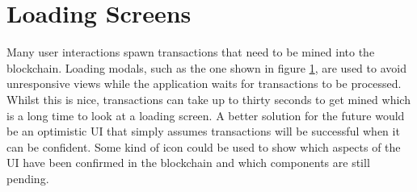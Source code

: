\section{Loading Screens}
\begin{figure}
\centering
{}
\decoRule
\caption[]{}
\label{fig:waitpage}
\end{figure}

Many user interactions spawn transactions that need to be mined into the blockchain. Loading modals, such as the one shown in figure \ref{fig:waitpage}, are used to avoid unresponsive views while the application waits for transactions to be processed. Whilst this is nice, transactions can take up to thirty seconds to get mined which is a long time to look at a loading screen. A better solution for the future would be an optimistic UI that simply assumes transactions will be successful when it can be confident. Some kind of icon could be used to show which aspects of the UI have been confirmed in the blockchain and which components are still pending.
















